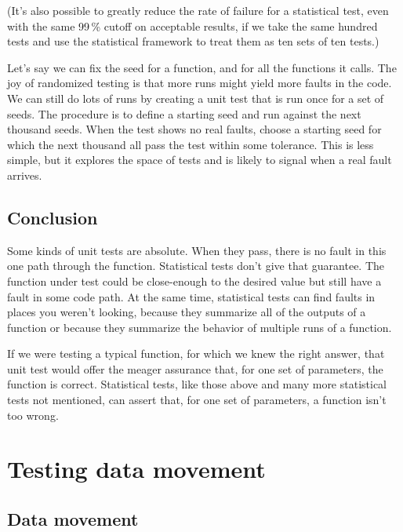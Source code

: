 \documentclass[fleqn,10pt]{olplainarticle}
\begin{document}
(It's also possible to greatly reduce the rate of failure
for a statistical test, even with the same 99\,\% cutoff
on acceptable results, if we take the same hundred tests
and use the statistical framework to treat them as ten sets
of ten tests.)

Let's say we can fix the seed for a function, and for all the
functions it calls. The joy of randomized testing is that more
runs might yield more faults in the code. We
can still do lots of runs by creating a unit test that is run once
for a set of seeds.  The procedure is to define a starting seed and run against
the next thousand seeds. When the test shows no real faults,
choose a starting seed for which the next thousand all pass
the test within some tolerance. This is less simple, but it
explores the space of tests and is likely to signal when
a real fault arrives.

\subsection{Conclusion}

Some kinds of unit tests are absolute. When they pass,
there is no fault in this one path through the function.
Statistical tests don't give that guarantee. The function
under test could be close-enough to the desired value but
still have a fault in some code path.
At the same time, statistical tests can find faults
in places you weren't looking, because they summarize all
of the outputs of a function or because they summarize
the behavior of multiple runs of a function.

If we were testing a typical function, for which we knew the
right answer, that unit test would offer the meager assurance that,
for one set of parameters, the function is correct.
Statistical tests, like those above and many more statistical
tests not mentioned, can assert that, for one set of parameters,
a function isn't too wrong.





\section{Testing data movement}\label{sec:data-movement}

\subsection{Data movement}\label{sec:movement-movement}
\end{document}
